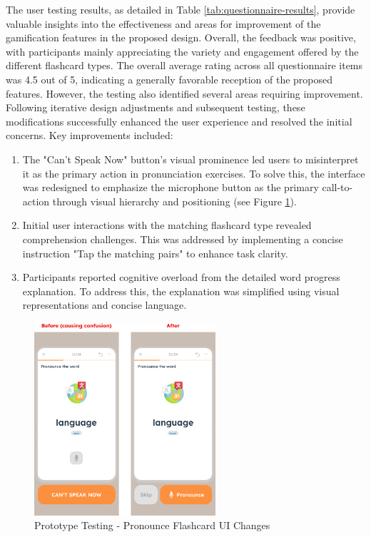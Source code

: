 The user testing results, as detailed in Table \ref{tab:questionnaire-results}, provide valuable insights into the effectiveness and areas for improvement of the gamification features in the proposed design. Overall, the feedback was positive, with participants mainly appreciating the variety and engagement offered by the different flashcard types. The overall average rating across all questionnaire items was 4.5 out of 5, indicating a generally favorable reception of the proposed features. However, the testing also identified several areas requiring improvement. Following iterative design adjustments and subsequent testing, these modifications successfully enhanced the user experience and resolved the initial concerns. Key improvements included:
\begin{enumerate}
    \item The "Can't Speak Now" button's visual prominence led users to misinterpret it as the primary action in pronunciation exercises. To solve this, the interface was redesigned to emphasize the microphone button as the primary call-to-action through visual hierarchy and positioning (see Figure \ref{fig:em-testing-pronunciation-before-after}).
    
    \item Initial user interactions with the matching flashcard 
    type revealed comprehension challenges. This was addressed by implementing a concise instruction "Tap the matching pairs" to enhance task clarity.
    
    \item Participants reported cognitive overload from the detailed word progress explanation. To address this, the explanation was simplified using visual representations and concise language.
\end{enumerate}
\begin{figure}[!h]
    \centering
    \includegraphics[width=0.60\textwidth]{src/figures/em-testing-pronunciation-before-after.png}
    \caption{Prototype Testing - Pronounce Flashcard UI Changes}
    \label{fig:em-testing-pronunciation-before-after}
\end{figure}

